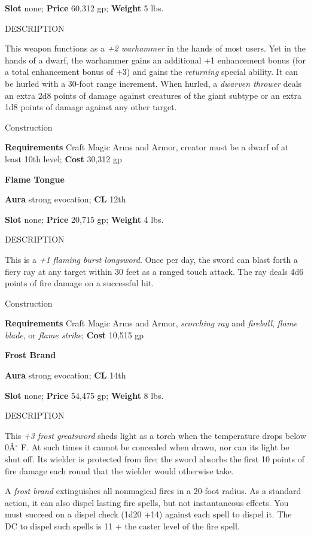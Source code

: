 \textbf{Slot} none; \textbf{Price} 60,312 gp; \textbf{Weight} 5 lbs.
				
DESCRIPTION
				
This weapon functions as a \textit{+2 warhammer} in the hands of most users. Yet in the hands of a dwarf, the warhammer gains an additional +1 enhancement bonus (for a total enhancement bonus of +3) and gains the \textit{returning} special ability. It can be hurled with a 30-foot range increment. When hurled, a \textit{dwarven thrower} deals an extra 2d8 points of damage against creatures of the giant subtype or an extra 1d8 points of damage against any other target. 
				
Construction
				
\textbf{Requirements} Craft Magic Arms and Armor, creator must be a dwarf of at least 10th level; \textbf{Cost }30,312 gp
				
\textbf{Flame Tongue}
				
\textbf{Aura} strong evocation; \textbf{CL} 12th
				
\textbf{Slot} none; \textbf{Price} 20,715 gp; \textbf{Weight} 4 lbs.
				
DESCRIPTION
				
This is a \textit{+1 flaming burst longsword}. Once per day, the sword can blast forth a fiery ray at any target within 30 feet as a ranged touch attack. The ray deals 4d6 points of fire damage on a successful hit. 
				
Construction
				
\textbf{Requirements} Craft Magic Arms and Armor, \textit{scorching ray }and \textit{fireball}, \textit{flame blade}, or \textit{flame strike}; \textbf{Cost }10,515 gp
				
\textbf{Frost Brand}
				
\textbf{Aura} strong evocation; \textbf{CL} 14th
				
\textbf{Slot} none; \textbf{Price} 54,475 gp; \textbf{Weight} 8 lbs.
				
DESCRIPTION
				
This \textit{+3 frost greatsword} sheds light as a torch when the temperature drops below 0\^A\mbox{${}^\circ$} F. At such times it cannot be concealed when drawn, nor can its light be shut off. Its wielder is protected from fire; the sword absorbs the first 10 points of fire damage each round that the wielder would otherwise take.
				
A \textit{frost brand} extinguishes all nonmagical fires in a 20-foot radius. As a standard action, it can also dispel lasting fire spells, but not instantaneous effects. You must succeed on a dispel check (1d20 +14) against each spell to dispel it. The DC to dispel such spells is 11 + the caster level of the fire spell. 
				
